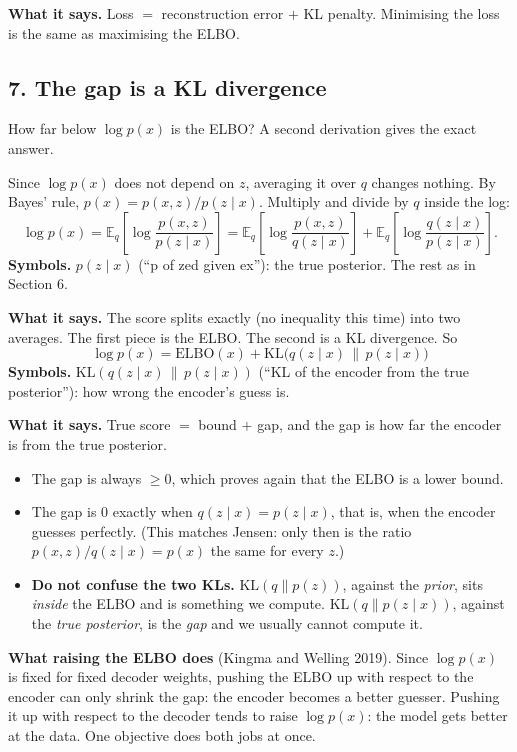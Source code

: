 \textbf{What it says.} Loss $=$ reconstruction error $+$ KL penalty. Minimising the loss is the same as maximising the ELBO.

\subsection*{7. The gap is a KL divergence}

How far below $\log p(x)$ is the ELBO? A second derivation gives the exact answer.

Since $\log p(x)$ does not depend on $z$, averaging it over $q$ changes nothing. By Bayes' rule, $p(x) = p(x, z)/p(z \mid x)$. Multiply and divide by $q$ inside the log:
\[
\log p(x) = \mathbb{E}_q\!\left[\log \frac{p(x, z)}{p(z \mid x)}\right]
= \mathbb{E}_q\!\left[\log \frac{p(x, z)}{q(z \mid x)}\right] + \mathbb{E}_q\!\left[\log \frac{q(z \mid x)}{p(z \mid x)}\right].
\]
\textbf{Symbols.} $p(z \mid x)$ (``p of zed given ex''): the true posterior. The rest as in Section 6.

\textbf{What it says.} The score splits exactly (no inequality this time) into two averages. The first piece is the ELBO. The second is a KL divergence. So
\[
\log p(x) = \mathrm{ELBO}(x) + \mathrm{KL}\big(q(z \mid x)\,\|\,p(z \mid x)\big)
\]
\textbf{Symbols.} $\mathrm{KL}(q(z \mid x)\,\|\,p(z \mid x))$ (``KL of the encoder from the true posterior''): how wrong the encoder's guess is.

\textbf{What it says.} True score $=$ bound $+$ gap, and the gap is how far the encoder is from the true posterior.
\begin{itemize}[leftmargin=1.5em]
\item The gap is always $\ge 0$, which proves again that the ELBO is a lower bound.
\item The gap is 0 exactly when $q(z \mid x) = p(z \mid x)$, that is, when the encoder guesses perfectly. (This matches Jensen: only then is the ratio $p(x,z)/q(z \mid x) = p(x)$ the same for every $z$.)
\item \textbf{Do not confuse the two KLs.} $\mathrm{KL}(q \| p(z))$, against the \emph{prior}, sits \emph{inside} the ELBO and is something we compute. $\mathrm{KL}(q \| p(z \mid x))$, against the \emph{true posterior}, is the \emph{gap} and we usually cannot compute it.
\end{itemize}

\textbf{What raising the ELBO does} (Kingma and Welling 2019). Since $\log p(x)$ is fixed for fixed decoder weights, pushing the ELBO up with respect to the encoder can only shrink the gap: the encoder becomes a better guesser. Pushing it up with respect to the decoder tends to raise $\log p(x)$: the model gets better at the data. One objective does both jobs at once.

